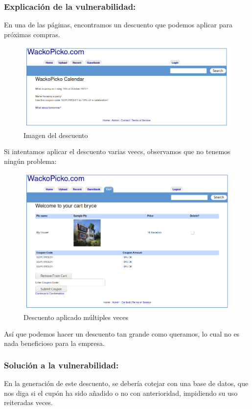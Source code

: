 \documentclass[12pt,twoside]{article}
\begin{document}
\subsubsection*{Explicación de la vulnerabilidad:}
En una de las páginas, encontramos un descuento que podemos aplicar para próximas compras.
\begin{figure}[H]
    \centering
    \includegraphics[scale=0.5]{./imagenes/descuentO_1}
    \caption{Imagen del descuento}
\end{figure}
Si intentamos aplicar el descuento varias veecs, observamos que no tenemos ningún problema:
\begin{figure}[H]
    \centering
    \includegraphics[scale=0.45]{./imagenes/descuento_2}
    \caption{Descuento aplicado múltiples veces}
\end{figure}
Así que podemos hacer un descuento tan grande como queramos, lo cual no es nada beneficioso para la empresa.
\subsubsection*{Solución a  la vulnerabilidad:}
En la generación de este descuento, se debería cotejar con una base de datos, que nos diga si el cupón ha sido añadido o no con anterioridad, impidiendo su uso reiteradas veces.
\end{document}
